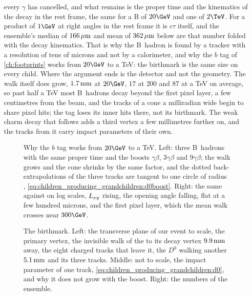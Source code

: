 every $\gamma$ has cancelled, and what remains is the proper time and the
kinematics of the decay in the rest frame, the same for a B of $20\GeV$
and one of $2\TeV$. For a product of $1\GeV$ at right angles in the rest
frame it is $c\tau$ itself, and the ensemble's median of $166\,\mu\mathrm{m}$ and
mean of $362\,\mu\mathrm{m}$ below are that number folded with the decay kinematics.
That is why the B~hadron is found by a tracker with a resolution of tens
of microns and not by a calorimeter, and why the $b$ tag of
\cref{ch:footprints} works from $20\GeV$ to a TeV: the birthmark is the
same size on every child. Where the argument ends is the detector and
not the geometry. The walk itself does grow, $1.7\,\mathrm{mm}$ at $20\GeV$, $17$
at $200$ and $87$ at a TeV on average, so past half a TeV most B~hadrons
decay beyond the first pixel layer, a few centimetres from the beam, and
the tracks of a cone a milliradian wide begin to share pixel hits; the
tag loses its inner hits there, not its birthmark. The weak charm decay
that follows adds a third vertex a few millimetres further on, and the
tracks from it carry impact parameters of their own.

\begin{figure}[htbp]\centering
\resizebox{\textwidth}{!}{}
\caption[Why the impact parameter does not grow with the boost]{Why the
$b$ tag works from $20\GeV$ to a TeV. Left: three B~hadrons with the same
proper time and the boosts $\gamma\beta$, $3\gamma\beta$ and
$9\gamma\beta$; the walk grows and the cone shrinks by the same factor,
and the dotted back-extrapolations of the three tracks are tangent to one
circle of radius \dzero,
\cref{eq:children_producing_grandchildren:d0boost}. Right: the same
against \pt on log scales, $L_{xy}$ rising, the opening angle falling,
\dzero flat at a few hundred microns, and the first pixel layer, which
the mean walk crosses near $300\GeV$.}
\label{fig:children_producing_grandchildren:boost_sketch}
\end{figure}

\begin{figure}[htbp]\centering
\resizebox{\textwidth}{!}{}
\caption[The decay vertices of our event and the impact parameter]{The
birthmark. Left: the transverse plane of our event to scale, the primary
vertex, the invisible walk of the \Bbar to its decay vertex $9.9\,\mathrm{mm}$ away,
the eight charged tracks that leave it, the $D^0$ walking another $5.1\,\mathrm{mm}$
and its three tracks. Middle: not to scale, the impact parameter of one
track, \cref{eq:children_producing_grandchildren:d0}, and why it does not
grow with the boost. Right: the numbers of the ensemble.}
\label{fig:children_producing_grandchildren:vertex_sketch}
\end{figure}

